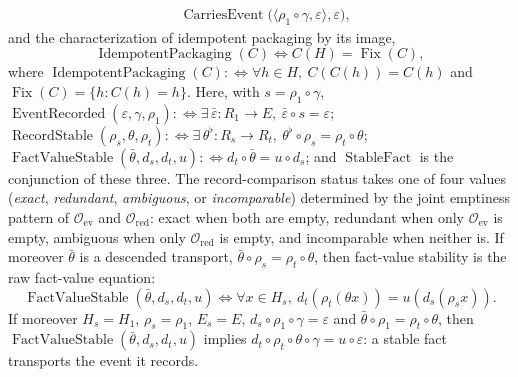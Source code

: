 \begin{theorem}
\begin{align*}
  &\operatorname{CarriesEvent}
      \bigl(\langle\rho_1\circ\gamma,\varepsilon\rangle,
        \varepsilon\bigr),
\end{align*}
and the characterization of idempotent packaging by its image,
\[
  \operatorname{IdempotentPackaging}(C)
  \iff
  C(H)=\operatorname{Fix}(C),
\]
where \(\operatorname{IdempotentPackaging}(C):\Longleftrightarrow\forall h\in H,\ C(C(h))=C(h)\)
and \(\operatorname{Fix}(C)=\{h:C(h)=h\}\). Here, with \(s=\rho_1\circ\gamma\),
\(\operatorname{EventRecorded}(\varepsilon,\gamma,\rho_1):\Longleftrightarrow\exists\,\bar\varepsilon:R_1\to E,\ \bar\varepsilon\circ s=\varepsilon\);
\(\operatorname{RecordStable}(\rho_s,\theta,\rho_t):\Longleftrightarrow\exists\,\theta^\flat:R_s\to R_t,\ \theta^\flat\circ\rho_s=\rho_t\circ\theta\);
\(\operatorname{FactValueStable}(\bar\theta,d_s,d_t,u):\Longleftrightarrow d_t\circ\bar\theta=u\circ d_s\);
and \(\operatorname{StableFact}\) is the conjunction of these three.
The record-comparison status takes one of four values
(\emph{exact}, \emph{redundant}, \emph{ambiguous}, or
\emph{incomparable}) determined by the joint emptiness pattern of
\(\mathcal O_{\mathrm{ev}}\) and \(\mathcal O_{\mathrm{red}}\): exact when
both are empty, redundant when only \(\mathcal O_{\mathrm{ev}}\) is empty,
ambiguous when only \(\mathcal O_{\mathrm{red}}\) is empty, and incomparable
when neither is.
If moreover \(\bar\theta\) is a descended transport,
\(\bar\theta\circ\rho_s=\rho_t\circ\theta\), then fact-value stability is the
raw fact-value equation:
\[
  \operatorname{FactValueStable}(\bar\theta,d_s,d_t,u)
  \iff
  \forall x\in H_s,\ d_t(\rho_t(\theta x))=u(d_s(\rho_s x)).
\]
If moreover \(H_s=H_1\), \(\rho_s=\rho_1\), \(E_s=E\),
\(d_s\circ\rho_1\circ\gamma=\varepsilon\) and
\(\bar\theta\circ\rho_1=\rho_t\circ\theta\), then
\(\operatorname{FactValueStable}(\bar\theta,d_s,d_t,u)\) implies
\(d_t\circ\rho_t\circ\theta\circ\gamma=u\circ\varepsilon\): a stable fact
transports the event it records.
\end{theorem}
